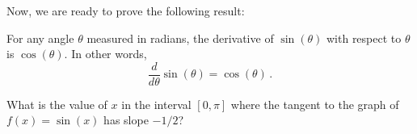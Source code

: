 \documentclass[10pt,t,presentation,ignorenonframetext,aspectratio=169]{beamer}
\begin{document}
\begin{frame}
  \vs
  Now, we are ready to prove the following result:
  \begin{thm}
    For any angle $\theta$ measured in radians, the derivative of $\sin(\theta)$ with respect to $\theta$ is $\cos(\theta)$.  In other words,
    \[
      \frac{d}{d\theta} \sin(\theta) = \cos(\theta) \,.
    \]
  \end{thm}

\end{frame}

\begin{frame}
  \vs
  \begin{question}
    What is the value of $x$ in the interval $[0, \pi]$ where the tangent to the graph of $f(x) = \sin(x)$ has slope $-1/2$?
  \end{question}
\end{frame}
\end{document}
